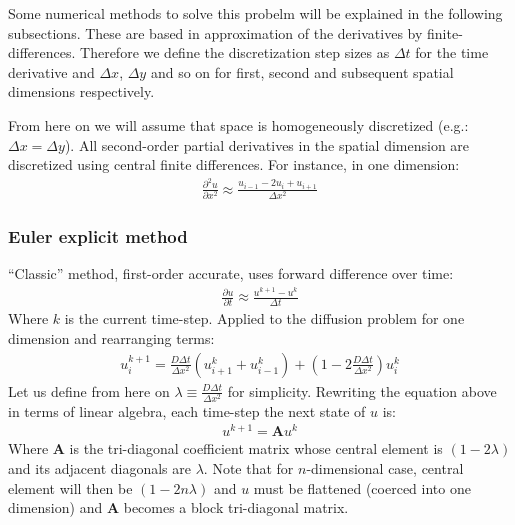 \documentclass[letterpaper,10pt,english]{sphinxmanual}
\begin{document}
Some numerical methods to solve this probelm will be explained in
the following subsections. These are based in approximation of the
derivatives by finite-differences. Therefore we define the
discretization step sizes as \(\Delta t\) for the time derivative
and \(\Delta x\), \(\Delta y\) and so on for first, second and
subsequent spatial dimensions respectively.

From here on we will assume that space is homogeneously discretized
(e.g.: \(\Delta x=\Delta y\)). All second-order partial
derivatives in the spatial dimension are discretized using central
finite differences. For instance, in one dimension:
\begin{equation*}
\begin{split}\frac{\partial^2u}{\partial x^2}\approx\frac{u_{i-1}-2u_i+u_{i+1  }}{\Delta x^2}\end{split}
\end{equation*}

\subsubsection{Euler explicit method}
\label{\detokenize{diffusion:euler-explicit-method}}
“Classic” method, first-order accurate, uses forward difference over
time:
\begin{equation*}
\begin{split}\frac{\partial u}{\partial t}\approx\frac{u^{k+1}-u^k}{\Delta t}\end{split}
\end{equation*}
Where \(k\) is the current time-step. Applied to the diffusion
problem for one dimension and rearranging terms:
\begin{equation*}
\begin{split}u_i^{k+1}=\frac{D\Delta t}{\Delta x^2}\left(u_{i+1}^k+u_{i-1}^k  \right)+\left(1-2\frac{D\Delta t}{\Delta x^2}\right)u_i^k\end{split}
\end{equation*}
Let us define from here on \(\lambda\equiv\frac{D\Delta t}{\Delta x^2}\) for simplicity. Rewriting the equation above in terms of
linear algebra, each time-step the next state of \(u\) is:
\begin{equation*}
\begin{split}u^{k+1}=\mathbf{A}u^{k}\end{split}
\end{equation*}
Where \(\mathbf{A}\) is the tri-diagonal coefficient matrix whose
central element is \((1-2\lambda)\) and its adjacent diagonals are
\(\lambda\). Note that for \(n\)-dimensional case, central
element will then be \((1-2n\lambda)\) and \(u\) must be
flattened (coerced into one dimension) and \(\mathbf{A}\) becomes
a block tri-diagonal matrix.
\end{document}
